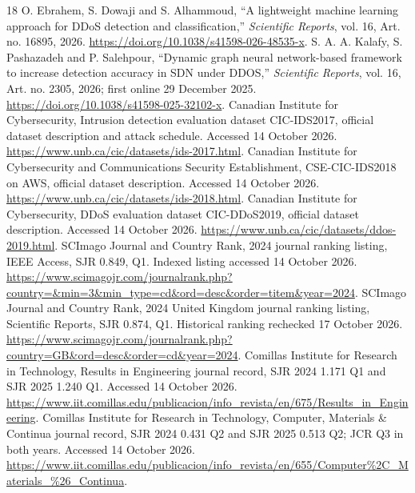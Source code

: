 \documentclass[conference]{IEEEtran}
\begin{document}
\begin{thebibliography}{18}
 O. Ebrahem, S. Dowaji and S. Alhammoud, ``A lightweight machine learning approach for DDoS detection and classification,\textquotedblright{} \emph{Scientific Reports}, vol. 16, Art. no. 16895, 2026. \url{https://doi.org/10.1038/s41598-026-48535-x}.
 S. A. A. Kalafy, S. Pashazadeh and P. Salehpour, ``Dynamic graph neural network-based framework to increase detection accuracy in SDN under DDOS,\textquotedblright{} \emph{Scientific Reports}, vol. 16, Art. no. 2305, 2026; first online 29 December 2025. \url{https://doi.org/10.1038/s41598-025-32102-x}.
 Canadian Institute for Cybersecurity, Intrusion detection evaluation dataset CIC-IDS2017, official dataset description and attack schedule. Accessed 14 October 2026. \url{https://www.unb.ca/cic/datasets/ids-2017.html}.
 Canadian Institute for Cybersecurity and Communications Security Establishment, CSE-CIC-IDS2018 on AWS, official dataset description. Accessed 14 October 2026. \url{https://www.unb.ca/cic/datasets/ids-2018.html}.
 Canadian Institute for Cybersecurity, DDoS evaluation dataset CIC-DDoS2019, official dataset description. Accessed 14 October 2026. \url{https://www.unb.ca/cic/datasets/ddos-2019.html}.
 SCImago Journal and Country Rank, 2024 journal ranking listing, IEEE Access, SJR 0.849, Q1. Indexed listing accessed 14 October 2026. \url{https://www.scimagojr.com/journalrank.php?country=&min=3&min_type=cd&ord=desc&order=titem&year=2024}.
 SCImago Journal and Country Rank, 2024 United Kingdom journal ranking listing, Scientific Reports, SJR 0.874, Q1. Historical ranking rechecked 17 October 2026. \url{https://www.scimagojr.com/journalrank.php?country=GB&ord=desc&order=cd&year=2024}.
 Comillas Institute for Research in Technology, Results in Engineering journal record, SJR 2024 1.171 Q1 and SJR 2025 1.240 Q1. Accessed 14 October 2026. \url{https://www.iit.comillas.edu/publicacion/info_revista/en/675/Results_in_Engineering}.
 Comillas Institute for Research in Technology, Computer, Materials \& Continua journal record, SJR 2024 0.431 Q2 and SJR 2025 0.513 Q2; JCR Q3 in both years. Accessed 14 October 2026. \url{https://www.iit.comillas.edu/publicacion/info_revista/en/655/Computer%2C_Materials_%26_Continua}.
\end{thebibliography}
\end{document}
